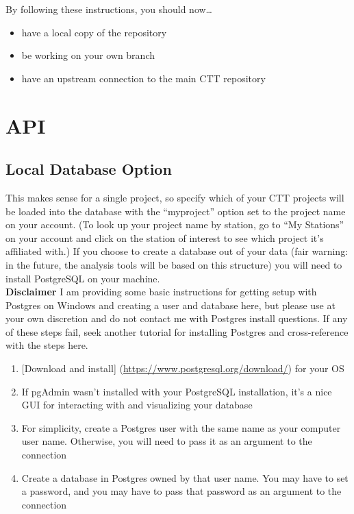 \documentclass[
]{book}
\providecommand{\tightlist}{%
  \setlength{\itemsep}{0pt}\setlength{\parskip}{0pt}}
\begin{document}
By following these instructions, you should now\ldots{}

\begin{itemize}
\tightlist
\item
  have a local copy of the repository\\
\item
  be working on your own branch\\
\item
  have an upstream connection to the main CTT repository
\end{itemize}

\hypertarget{intro}{%
\chapter{API}\label{intro}}

\hypertarget{local-database-option}{%
\section{Local Database Option}\label{local-database-option}}

This makes sense for a single project, so specify which of your CTT projects will be loaded into the database with the ``myproject'' option set to the project name on your account. (To look up your project name by station, go to ``My Stations'' on your account and click on the station of interest to see which project it's affiliated with.) If you choose to create a database out of your data (fair warning: in the future, the analysis tools will be based on this structure) you will need to install PostgreSQL on your machine.\\
\textbf{Disclaimer} I am providing some basic instructions for getting setup with Postgres on Windows and creating a user and database here, but please use at your own discretion and do not contact me with Postgres install questions. If any of these steps fail, seek another tutorial for installing Postgres and cross-reference with the steps here.

\begin{enumerate}
\def\labelenumi{\arabic{enumi}.}
\tightlist
\item
  {[}Download and install{]} (\url{https://www.postgresql.org/download/}) for your OS\\
\item
  If pgAdmin wasn't installed with your PostgreSQL installation, it's a nice GUI for interacting with and visualizing your database
\item
  For simplicity, create a Postgres user with the same name as your computer user name. Otherwise, you will need to pass it as an argument to the connection\\
\item
  Create a database in Postgres owned by that user name. You may have to set a password, and you may have to pass that password as an argument to the connection
\end{enumerate}
\end{document}
